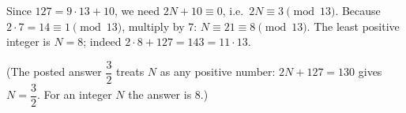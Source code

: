 Since $127=9\cdot13+10$, we need $2N+10\equiv0$, i.e.\ $2N\equiv3\pmod{13}$. Because $2\cdot7=14\equiv1\pmod{13}$, multiply by $7$: $N\equiv21\equiv8\pmod{13}$. The least positive integer is $N=\boxed{8}$; indeed $2\cdot8+127=143=11\cdot13$.

(The posted answer $\dfrac{3}{2}$ treats $N$ as any positive number: $2N+127=130$ gives $N=\dfrac{3}{2}$. For an integer $N$ the answer is $8$.)
